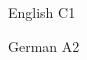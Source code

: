 
\begin{cvskills}

  \cvskill
    {English} %
    {C1} %

  \cvskill
    {German} %
    {A2} %
    
\end{cvskills}
